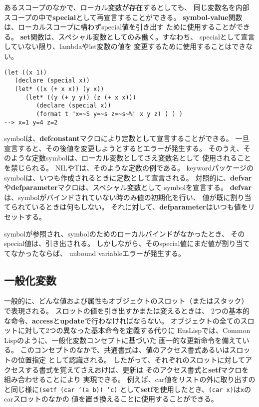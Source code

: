 
あるスコープのなかで、ローカル変数が存在するとしても、
同じ変数名を内部スコープの中で{\bf special}として再宣言することができる。
{\bf symbol-value}関数は、ローカルスコープに構わずspecial値を引き出す
ために使用することができる。
{\bf set}関数は、スペシャル変数としてのみ働く。すなわち、
specialとして宣言していない限り、lambdaやlet変数の値を
変更するために使用することはできない。

\begin{verbatim}
(let ((x 1))
   (declare (special x))
   (let* ((x (+ x x)) (y x))
      (let* ((y (+ y y)) (z (+ x x)))
         (declare (special x))
         (format t "x=~S y=~s z=~s~%" x y z) ) ) )
--> x=1 y=4 z=2
\end{verbatim}

symbolは、{\bf defconstant}マクロにより定数として宣言することができる。
一旦宣言すると、その後値を変更しようとするとエラーが発生する。
そのうえ、そのような定数symbolは、ローカル変数としてさえ変数名として
使用されることを禁じられる。
NILやTは、そのような定数の例である。
keywordパッケージのsymbolは、いつも作成されるときに定数として宣言される。
対照的に、{\bf defvar}や{\bf defparameter}マクロは、スペシャル変数として
symbolを宣言する。
{\bf defvar}は、symbolがバインドされていない時のみ値の初期化を行い、
値が既に割り当てられているときは何もしない。
それに対して、{\bf defparameter}はいつも値をリセットする。

symbolが参照され、symbolのためのローカルバインドがなかったとき、
そのspecial値は、引き出される。
しかしながら、そのspecial値にまだ値が割り当ててなかったならば、
unbound variableエラーが発生する。

\subsection{一般化変数}
一般的に、どんな値および属性もオブジェクトのスロット（またはスタック）
で表現される。
スロットの値を引き出すかまたは変えるときは、
2つの基本的な命令、{\bf access}と{\bf update}で行わなければならない。
オブジェクトの全てのスロットに対して2つの異なった基本命令を定義する代りに
EusLispでは、Common Lispのように、一般化変数コンセプトに基づいた
画一的な更新命令を備えている。
このコンセプトのなかで、共通書式は、値のアクセス書式あるいはスロットの位置指定
として認識される。
したがって、それぞれのスロットに対してアクセスする書式を覚えてさえおけば、更新は
そのアクセス書式と{\bf setf}マクロを組み合わせることにより
実現できる。
例えば、car値をリストの外に取り出すのと同じ様に{\tt (setf (car '(a b)) 'c)}
として{\bf setf}を使用したとき、{\tt (car x)}は{\tt x}のcarスロットのなかの
値を置き換えることに使用することができる。

